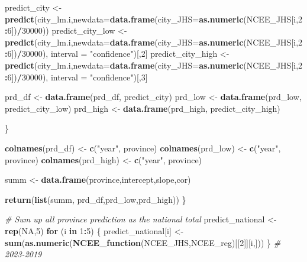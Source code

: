 \documentclass[]{article}
\newenvironment{Shaded}{\begin{snugshade}}{\end{snugshade}}
\newcommand{\KeywordTok}[1]{\textcolor[rgb]{0.13,0.29,0.53}{\textbf{#1}}}
\newcommand{\DataTypeTok}[1]{\textcolor[rgb]{0.13,0.29,0.53}{#1}}
\newcommand{\DecValTok}[1]{\textcolor[rgb]{0.00,0.00,0.81}{#1}}
\newcommand{\StringTok}[1]{\textcolor[rgb]{0.31,0.60,0.02}{#1}}
\newcommand{\CommentTok}[1]{\textcolor[rgb]{0.56,0.35,0.01}{\textit{#1}}}
\newcommand{\OtherTok}[1]{\textcolor[rgb]{0.56,0.35,0.01}{#1}}
\newcommand{\ControlFlowTok}[1]{\textcolor[rgb]{0.13,0.29,0.53}{\textbf{#1}}}
\newcommand{\OperatorTok}[1]{\textcolor[rgb]{0.81,0.36,0.00}{\textbf{#1}}}
\newcommand{\NormalTok}[1]{#1}
\begin{document}
\begin{Shaded}
\begin{Highlighting}[]
\NormalTok{    predict_city <-}\KeywordTok{predict}\NormalTok{(city_lm.i,}\DataTypeTok{newdata=}\KeywordTok{data.frame}\NormalTok{(}\DataTypeTok{city_JHS=}\KeywordTok{as.numeric}\NormalTok{(NCEE_JHS[i,}\DecValTok{2}\OperatorTok{:}\DecValTok{6}\NormalTok{])}\OperatorTok{/}\DecValTok{30000}\NormalTok{))}
\NormalTok{    predict_city_low <-}\KeywordTok{predict}\NormalTok{(city_lm.i,}\DataTypeTok{newdata=}\KeywordTok{data.frame}\NormalTok{(}\DataTypeTok{city_JHS=}\KeywordTok{as.numeric}\NormalTok{(NCEE_JHS[i,}\DecValTok{2}\OperatorTok{:}\DecValTok{6}\NormalTok{])}\OperatorTok{/}\DecValTok{30000}\NormalTok{), }\DataTypeTok{interval =} \StringTok{"confidence"}\NormalTok{)[,}\DecValTok{2}\NormalTok{]}
\NormalTok{    predict_city_high <-}\KeywordTok{predict}\NormalTok{(city_lm.i,}\DataTypeTok{newdata=}\KeywordTok{data.frame}\NormalTok{(}\DataTypeTok{city_JHS=}\KeywordTok{as.numeric}\NormalTok{(NCEE_JHS[i,}\DecValTok{2}\OperatorTok{:}\DecValTok{6}\NormalTok{])}\OperatorTok{/}\DecValTok{30000}\NormalTok{), }\DataTypeTok{interval =} \StringTok{"confidence"}\NormalTok{)[,}\DecValTok{3}\NormalTok{]}
    
\NormalTok{    prd_df <-}\StringTok{ }\KeywordTok{data.frame}\NormalTok{(prd_df, predict_city)}
\NormalTok{    prd_low <-}\StringTok{ }\KeywordTok{data.frame}\NormalTok{(prd_low, predict_city_low)}
\NormalTok{    prd_high <-}\StringTok{ }\KeywordTok{data.frame}\NormalTok{(prd_high, predict_city_high)}
    
\NormalTok{  \}}
  
  \KeywordTok{colnames}\NormalTok{(prd_df) <-}\StringTok{ }\KeywordTok{c}\NormalTok{(}\StringTok{"year"}\NormalTok{, province)}
  \KeywordTok{colnames}\NormalTok{(prd_low) <-}\StringTok{ }\KeywordTok{c}\NormalTok{(}\StringTok{"year"}\NormalTok{, province)}
  \KeywordTok{colnames}\NormalTok{(prd_high) <-}\StringTok{ }\KeywordTok{c}\NormalTok{(}\StringTok{"year"}\NormalTok{, province)}
  
\NormalTok{  summ <-}\StringTok{ }\KeywordTok{data.frame}\NormalTok{(province,intercept,slope,cor)}
  
  \KeywordTok{return}\NormalTok{(}\KeywordTok{list}\NormalTok{(summ, prd_df,prd_low,prd_high))}
\NormalTok{\}}


\CommentTok{# Sum up all province prediction as the national total}
\NormalTok{predict_national <-}\StringTok{ }\KeywordTok{rep}\NormalTok{(}\OtherTok{NA}\NormalTok{,}\DecValTok{5}\NormalTok{)}
\ControlFlowTok{for}\NormalTok{ (i }\ControlFlowTok{in} \DecValTok{1}\OperatorTok{:}\DecValTok{5}\NormalTok{) \{}
\NormalTok{  predict_national[i] <-}\StringTok{ }\KeywordTok{sum}\NormalTok{(}\KeywordTok{as.numeric}\NormalTok{(}\KeywordTok{NCEE_function}\NormalTok{(NCEE_JHS,NCEE_reg)[[}\DecValTok{2}\NormalTok{]][i,]))}
\NormalTok{\} }\CommentTok{# 2023-2019}
\end{Highlighting}
\end{Shaded}
\end{document}
